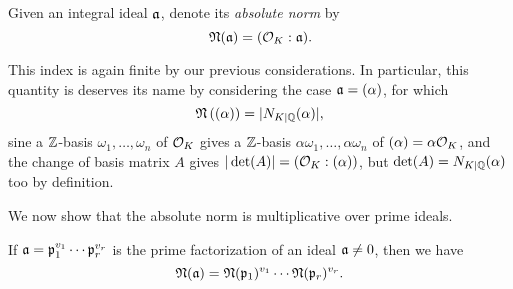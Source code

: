 Given an integral ideal $\mathfrak{a}$, denote its \emph{absolute norm} by
\[
	\mathfrak{N}(\mathfrak{a}) = (\mathcal{O}_K:\mathfrak{a}).
\]

This index is again finite by our previous considerations. In particular, this quantity is deserves its name by considering the case $\mathfrak{a}=(\alpha)$, for which
\[
	\mathfrak{N}\left((\alpha)\right) = |N_{K\mid\mathbb{Q}}(\alpha)|,
\]
sine a $\mathbb{Z}$-basis $\omega_1,\dots,\omega_n$ of $\mathcal{O}_K$ gives a $\mathbb{Z}$-basis $\alpha\omega_1,\dots,\alpha\omega_n$ of $(\alpha)=\alpha\mathcal{O}_K$, and the change of basis matrix $A$ gives $|\det(A)|=(\mathcal{O}_K:(\alpha))$, but $\det(A)=N_{K\mid\mathbb{Q}}(\alpha)$ too by definition.

We now show that the absolute norm is multiplicative over prime ideals.

\begin{proposition}
	If $\mathfrak{a}=\mathfrak{p}_1^{v_1}\cdots\mathfrak{p}_r^{v_r}$ is the prime factorization of an ideal $\mathfrak{a}\neq 0$, then we have
	\[
		\mathfrak{N}(\mathfrak{a}) = \mathfrak{N}(\mathfrak{p}_1)^{v_1}\cdots\mathfrak{N}(\mathfrak{p}_r)^{v_r}.
	\]
\end{proposition}
